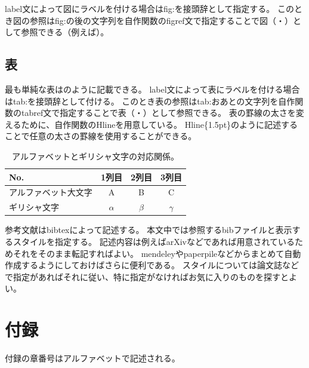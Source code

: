 \documentclass[uplatex]{jsarticle}
\begin{document}
\par
label文によって図にラベルを付ける場合はfig:を接頭辞として指定する。
このとき図の参照はfig:の後の文字列を自作関数のfigref文で指定することで図（・）として参照できる（例えば）。

\subsection{表}

最も単純な表はのように記載できる。
label文によって表にラベルを付ける場合はtab:を接頭辞として付ける。
このとき表の参照はtab:おあとの文字列を自作関数のtabref文で指定することで表（・）として参照できる。
表の罫線の太さを変えるために、自作関数のHlineを用意している。
Hline\{1.5pt\}のように記述することで任意の太さの罫線を使用することができる。
\begin{table}[H]
	\centering
	\caption{アルファベットとギリシャ文字の対応関係。}
	\label{tab:abc}
	\begin{tabular}{lccc}
		\Hline{1.5pt}
		No. & 1列目 & 2列目 & 3列目 \\
		\hline
		アルファベット大文字 & A & B & C \\
		ギリシャ文字 & $\alpha$ & $\beta$ & $\gamma$ \\
		\hline
	\end{tabular}
\end{table}









% 
参考文献はbibtexによって記述する。
本文中では参照するbibファイルと表示するスタイルを指定する。
記述内容は例えばarXivなどであれば用意されているためそれをそのまま転記すればよい。
mendeleyやpaperpileなどからまとめて自動作成するようにしておけばさらに便利である。
スタイルについては論文誌などで指定があればそれに従い、特に指定がなければお気に入りのものを探すとよい。


\newpage
\appendix

\section{付録}
付録の章番号はアルファベットで記述される。
\end{document}
